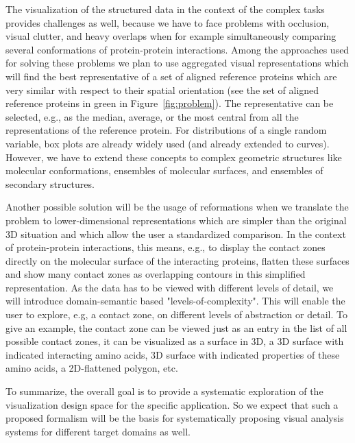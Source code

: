 \documentclass[11pt,a4paper,titlepage,oneside,onecolumn]{article}
\begin{document}
The visualization of the structured data in the context of the complex tasks provides challenges as well, because we have to face problems with occlusion, visual clutter, and heavy overlaps when for example simultaneously comparing several conformations of protein-protein interactions.
Among the approaches used for solving these problems we plan to use aggregated visual representations which will find the best representative of a set of aligned reference proteins which are very similar with respect to their spatial orientation (see the set of aligned reference proteins in green in Figure~\ref{fig:problem}).
The representative can be selected, e.g.,  as the median, average, or the most central from all the representations of the reference protein.
For distributions of a single random variable, box plots are already widely used (and already extended to curves).
However, we have to extend these concepts to complex geometric structures like molecular conformations, ensembles of molecular surfaces, and ensembles of secondary structures.

Another possible solution will be the usage of reformations when we translate the problem to lower-dimensional representations which are simpler than the original 3D situation and which allow the user a standardized comparison. 
In the context of protein-protein interactions, this means, e.g., to display the contact zones directly on the molecular surface of the interacting proteins, flatten these surfaces and show many contact zones as overlapping contours in this simplified representation.
As the data has to be viewed with different levels of detail, we will introduce domain-semantic based "levels-of-complexity". 
This will enable the user to explore, e.g, a contact zone, on different levels of abstraction or detail.
To give an example, the contact zone can be viewed just as an entry in the list of all possible contact zones, it can be visualized as a surface in 3D, a 3D surface with indicated interacting amino acids, 3D surface with indicated properties of these amino acids, a 2D-flattened polygon, etc.

To summarize, the overall goal is to provide a systematic exploration of the visualization design space for the specific application.
So we expect that such a proposed formalism will be the basis for systematically proposing visual analysis systems for different target domains as well.
\end{document}
